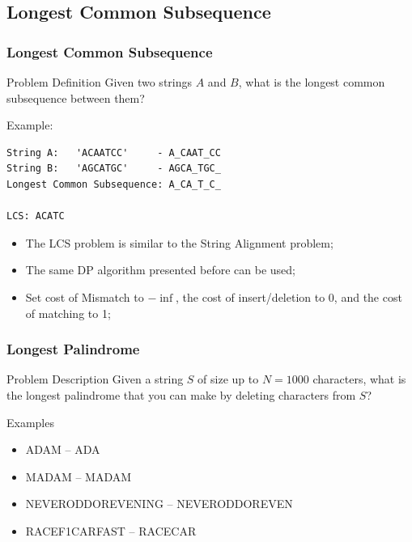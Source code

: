 \documentclass{beamer}
\begin{document}
\subsection{Longest Common Subsequence}

\begin{frame}[fragile]
  \frametitle{Longest Common Subsequence}
  {\smaller
    \begin{block}{Problem Definition}
      Given two strings $A$ and $B$, what is the longest common
      subsequence between them?

      \medskip
      
      Example:
\begin{verbatim}
String A:   'ACAATCC'     - A_CAAT_CC
String B:   'AGCATGC'     - AGCA_TGC_
Longest Common Subsequence: A_CA_T_C_

LCS: ACATC
\end{verbatim}
    \end{block}

    \begin{itemize}
    \item The LCS problem is similar to the String Alignment problem;
    \item The same DP algorithm presented before can be used;
    \item Set cost of Mismatch to $-\inf$, the cost of insert/deletion
      to 0, and the cost of matching to 1;
    \end{itemize}
  }
\end{frame}

\begin{frame}
  \frametitle{Longest Palindrome}
  {\smaller
    \begin{block}{Problem Description}
      Given a string $S$ of size up to $N = 1000$ characters, what is the
      longest palindrome that you can make by deleting characters from $S$?
    \end{block}

    Examples
    \begin{itemize}
    \item ADA\alert{M} -- ADA
    \item MADAM -- MADAM
    \item NEVERODDOREVEN\alert{ING} -- NEVERODDOREVEN
    \item RACE\alert{F1}CAR\alert{FAST} -- RACECAR
    \end{itemize}

  }
\end{frame}
\end{document}
